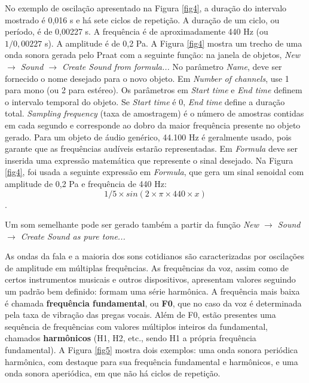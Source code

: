 \documentclass[portuguese]{textolivre}
\begin{document}
No exemplo de oscilação apresentado na Figura \ref{fig4}, a duração do intervalo mostrado é 0,016 s e há sete ciclos de repetição. A duração de um ciclo, ou período, é de 0,00227 s. A frequência é de aproximadamente 440 Hz (ou \(1 / 0,00227\) s). A amplitude é de 0,2 Pa. A Figura \ref{fig4} mostra um trecho de uma onda sonora gerada pelo Praat com a seguinte função: na janela de objetos, \textit{New $\rightarrow$ Sound $\rightarrow$  Create Sound from formula...} No parâmetro \textit{Name}, deve ser fornecido o nome desejado para o novo objeto. Em \textit{Number of channels}, use 1 para mono (ou 2 para estéreo). Os parâmetros em \textit{Start time} e \textit{End time} definem o intervalo temporal do objeto. Se \textit{Start time} é 0, \textit{End time} define a duração total. \textit{Sampling frequency} (taxa de amostragem) é o número de amostras contidas em cada segundo e corresponde ao dobro da maior frequência presente no objeto gerado. Para um objeto de áudio genérico, 44.100 Hz é geralmente usado, pois garante que as frequências audíveis estarão representadas. Em \textit{Formula} deve ser inserida uma expressão matemática que represente o sinal desejado. Na Figura \ref{fig4}, foi usada a seguinte expressão em \textit{Formula}, que gera um sinal senoidal com amplitude de 0,2 Pa e frequência de 440 Hz: \[1/5 \times sin(2 \times \pi \times 440 \times x)\].  

Um som semelhante pode ser gerado também a partir da função \textit{New $\rightarrow$ Sound $\rightarrow$  Create Sound as pure tone...}

As ondas da fala e a maioria dos sons cotidianos são caracterizadas por oscilações de amplitude em múltiplas frequências. As frequências da voz, assim como de certos instrumentos musicais e outros dispositivos, apresentam valores seguindo um padrão bem definido: formam uma série harmônica. A frequência mais baixa é chamada \textbf{frequência fundamental}, ou \textbf{F0}, que no caso da voz é determinada pela taxa de vibração das pregas vocais. Além de F0, estão presentes uma sequência de frequências com valores múltiplos inteiros da fundamental, chamados \textbf{harmônicos} (H1, H2, etc., sendo H1 a própria frequência fundamental). A Figura \ref{fig5} mostra dois exemplos: uma onda sonora periódica harmônica, com destaque para sua frequência fundamental e harmônicos, e uma onda sonora aperiódica, em que não há ciclos de repetição.
\end{document}
